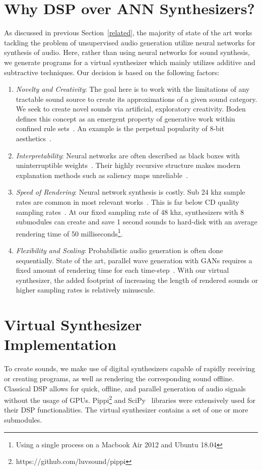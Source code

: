 \documentclass[\main/thesis.tex]{subfiles}
\begin{document}
\section{Why DSP over ANN Synthesizers?}
 As discussed in previous Section~\ref{related}, the majority of state of the art works tackling the problem of unsupervised audio generation utilize neural networks for synthesis of audio. Here, rather than using neural networks for sound synthesis, we generate programs for a virtual synthesizer which mainly utilizes additive and subtractive techniques. Our decision is based on the following factors:
\begin{enumerate}[label=(\roman*)]
    \item \textit{Novelty and Creativity}: The goal here is to work with the limitations of any tractable sound source to create its approximations of a given sound category. We seek to create novel sounds via artificial, exploratory creativity. Boden defines this concept as an emergent property of generative work within confined rule sets~\cite{boden2009computer}. An example is the perpetual popularity of 8-bit aesthetics~\cite{collins2007loop}. 
    \item \textit{Interpretability}: Neural networks are often described as black boxes with uninterruptible weights~\cite{basheer2000artificial}. Their highly recursive structure makes modern explanation methods such as saliency maps unreliable~\cite{rudin2019stop}.  
    \item \textit{Speed of Rendering}: Neural network synthesis is costly. Sub 24 khz sample rates are common in most relevant works~\cite{yamamoto2020parallel,oord2017parallel,aouameur2019neural,ramires2020neural}. This is far below CD quality sampling rates~\cite{reiss2016meta}. At our fixed sampling rate of 48 khz, synthesizers with 8 submodules can create and save 1 second sounds to hard-disk with an average rendering time of 50 milliseconds\footnote{Using a single process on a Macbook Air 2012 and Ubuntu 18.04}. 
    \item \textit{Flexibility and Scaling}: Probabilistic audio generation is often done sequentially. State of the art, parallel wave generation with GANs requires a fixed amount of rendering time for each time-step~\cite{yamamoto2020parallel}. With our virtual synthesizer, the added footprint of increasing the length of rendered sounds or higher sampling rates is relatively minuscule.  
\end{enumerate}

\section{Virtual Synthesizer Implementation}
\label{virtual_synth_implementation}
 To create sounds, we make use of digital synthesizers capable of rapidly receiving or creating programs, as well as rendering the corresponding sound offline. Classical DSP allows for quick, offline, and parallel generation of audio signals without the usage of GPUs. Pippi\footnote{https://github.com/luvsound/pippi} and SciPy~\cite{jones2001scipy} libraries were extensively used for their DSP functionalities. The virtual synthesizer contains a set of one or more submodules.
\end{document}
